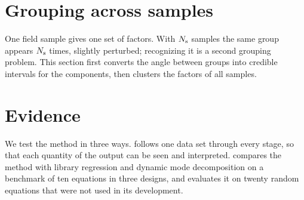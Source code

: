 \section{Grouping across samples}\label{sec:across}
\label{sec:bayesian}
One field sample gives one set of factors. With $N_{\mathrm s}$ samples the same group appears $N_{\mathrm s}$ times, slightly
perturbed; recognizing it is a second grouping problem. This section first converts the angle between groups into
credible intervals for the components, then clusters the factors of all samples.


\section{Evidence}\label{sec:evidence}
\label{sec:results}
We test the method in three ways.  follows one data set through every stage, so that each quantity of
the output can be seen and interpreted.  compares the method with library regression and dynamic mode
decomposition on a benchmark of ten equations in three designs, and evaluates it on twenty random equations that were
not used in its development.





\appendix






